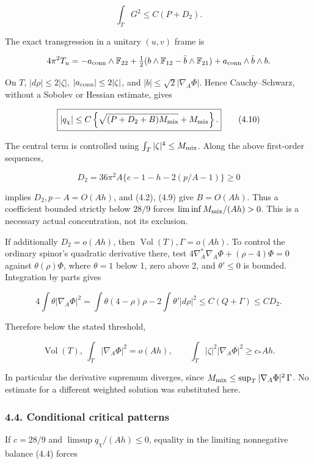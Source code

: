 \documentclass[
  10pt,
]{article}
\begin{document}
\[
 \int_TG^2\le C(P+D_2).
\]

The exact transgression in a unitary \((u,v)\) frame is

\[
 4\pi^2T_u=-a_{\rm conn}\wedge\mathbb F_{22}
 +\tfrac12(b\wedge\mathbb F_{12}-\bar b\wedge\mathbb F_{21})
 +a_{\rm conn}\wedge\bar b\wedge b.
\]

On \(T\), \(|d\rho|\le2|\zeta|\), \(|a_{\rm conn}|\le2|\zeta|\), and
\(|b|\le\sqrt2|\nabla_A\Phi|\). Hence Cauchy--Schwarz, without a Sobolev
or Hessian estimate, gives

\[
 \boxed{|q_\chi|\le
 C\left\{\sqrt{(P+D_2+B)M_{\rm mix}}+M_{\rm mix}\right\}.}
 \tag{4.10}
\]

The central term is controlled using \(\int_T|\zeta|^4\le M_{\rm mix}\).
Along the above first-order sequences,

\[
 D_2=36\pi^2A\{e-1-h-2(p/A-1)\}\ge0
\]

implies \(D_2,p-A=O(Ah)\), and (4.2), (4.9) give \(B=O(Ah)\). Thus a
coefficient bounded strictly below \(28/9\) forces
\(\liminf M_{\rm mix}/(Ah)>0\). This is a necessary actual
concentration, not its exclusion.

If additionally \(D_2=o(Ah)\), then
\(\operatorname{Vol}(T),\Gamma=o(Ah)\). To control the ordinary spinor's
quadratic derivative there, test
\(4\nabla_A^*\nabla_A\Phi+(\rho-4)\Phi=0\) against \(\theta(\rho)\Phi\),
where \(\theta=1\) below 1, zero above 2, and \(\theta'\le0\) is
bounded. Integration by parts gives

\[
 4\int\theta|\nabla_A\Phi|^2
  =\int\theta(4-\rho)\rho-2\int\theta'|d\rho|^2
  \le C(Q+\Gamma)\le CD_2.
 \tag{4.11}
\]

Therefore below the stated threshold,

\[
 \operatorname{Vol}(T),\ \int_T|\nabla_A\Phi|^2=o(Ah),
 \qquad \int_T|\zeta|^2|\nabla_A\Phi|^2\ge c_*Ah.
 \tag{4.12}
\]

In particular the derivative supremum diverges, since
\(M_{\rm mix}\le\sup_T|\nabla_A\Phi|^2\,\Gamma\). No estimate for a
different weighted solution was substituted here.

\hypertarget{conditional-critical-patterns}{%
\subsubsection{4.4. Conditional critical
patterns}\label{conditional-critical-patterns}}

If \(c=28/9\) and \(\limsup q_\chi/(Ah)\le0\), equality in the limiting
nonnegative balance (4.4) forces
\end{document}
